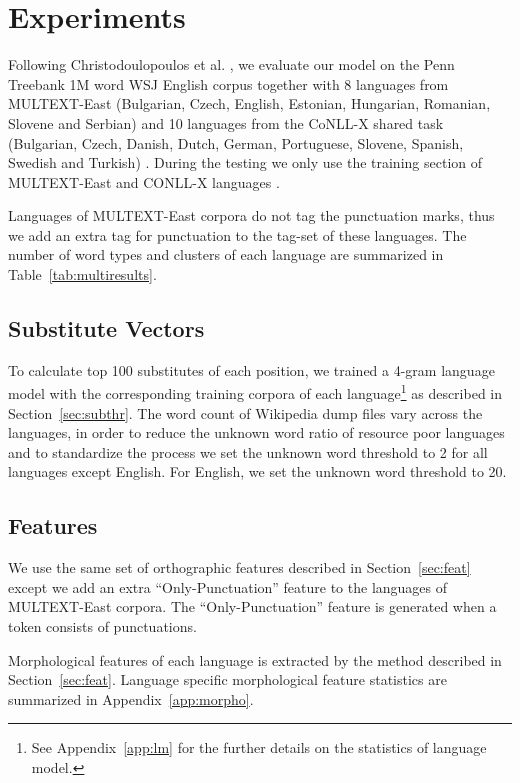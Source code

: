\section{Experiments}
\label{sec:multilang}
 

\noindent Following Christodoulopoulos et
al. , we
evaluate our model on the Penn Treebank 1M word WSJ English corpus
together with 8 languages from MULTEXT-East (Bulgarian, Czech,
English, Estonian, Hungarian, Romanian, Slovene and Serbian)
\cite{citeulike:5820223} and 10 languages from the CoNLL-X shared task
(Bulgarian, Czech, Danish, Dutch, German, Portuguese, Slovene,
Spanish, Swedish and Turkish)
\cite{Buchholz:2006:CST:1596276.1596305}.  During the testing we only
use the training section of MULTEXT-East and CONLL-X languages
\cite{Lee:2010:STU:1870658.1870741}.

Languages of MULTEXT-East corpora do not tag the punctuation marks,
thus we add an extra tag for punctuation to the tag-set of these
languages.  The number of word types and clusters of each language are
summarized in Table~\ref{tab:multiresults}.

\subsection{Substitute Vectors}
To calculate top 100 substitutes of each position, we trained a 4-gram
language model with the corresponding training corpora of each
language\footnote{See Appendix~\ref{app:lm} for the further details on
  the statistics of language model.}  as described in
Section~\ref{sec:subthr}.  The word count of Wikipedia dump files vary
across the languages, in order to reduce the unknown word ratio of
resource poor languages and to standardize the process we set the
unknown word threshold to 2 for all languages except English.  For
English, we set the unknown word threshold to 20.

\subsection{Features}
We use the same set of orthographic features described in
Section~\ref{sec:feat} except we add an extra ``Only-Punctuation''
feature to the languages of MULTEXT-East corpora.  The
``Only-Punctuation'' feature is generated when a token consists of
punctuations.

Morphological features of each language is extracted by the method
described in Section~\ref{sec:feat}.  Language specific morphological
feature statistics are summarized in Appendix~\ref{app:morpho}.

